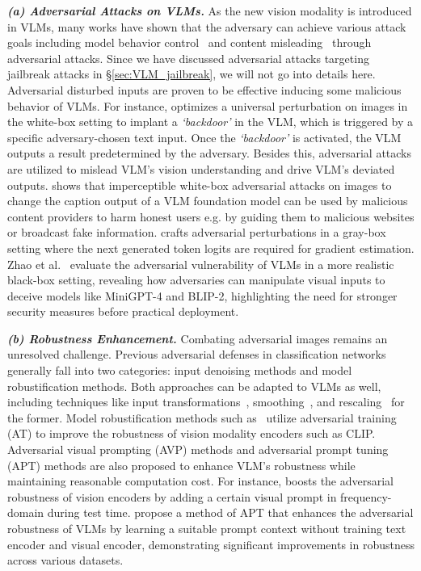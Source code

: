 \textit{\textbf{(a) Adversarial Attacks on VLMs.}} As the new vision modality is introduced in VLMs, many works have shown that the adversary can achieve various attack goals including model behavior control~\cite{bailey2023image,lu2024test} and content misleading~\cite{dong2023robust,bailey2023image,zhao2023evaluating,schlarmann2023adversarial, zhu2025calling} through adversarial attacks. Since we have discussed adversarial attacks targeting jailbreak attacks in \S\ref{sec:VLM_jailbreak}, we will not go into details here. Adversarial disturbed inputs are proven to be effective inducing some malicious behavior of VLMs. For instance, \cite{lu2024test} optimizes a universal perturbation on images in the white-box setting to implant a \textit{‘backdoor’} in the VLM, which is triggered by a specific adversary-chosen text input. Once the \textit{‘backdoor’} is activated, the VLM outputs a result predetermined by the adversary. Besides this, adversarial attacks are utilized to mislead VLM's vision understanding and drive VLM's deviated outputs. \cite{schlarmann2023adversarial} shows that imperceptible white-box adversarial attacks on images to change the caption output of a VLM foundation model can be used by malicious content providers to harm honest users e.g. by guiding them to malicious websites or broadcast fake information. \cite{bailey2023image} crafts adversarial perturbations in a gray-box setting where the next generated token logits are required for gradient estimation. Zhao et al.~\cite{zhao2023evaluating} evaluate the adversarial vulnerability of VLMs in a more realistic black-box setting, revealing how adversaries can manipulate visual inputs to deceive models like MiniGPT-4 and BLIP-2, highlighting the need for stronger security measures before practical deployment. 

\textit{\textbf{(b) Robustness Enhancement.}} Combating adversarial images remains an unresolved challenge. Previous adversarial defenses in classification networks generally fall into two categories: input denoising methods and model robustification methods. Both approaches can be adapted to VLMs as well, including techniques like input transformations~\cite{mustafa2019image}, smoothing~\cite{salman2020denoised}, and rescaling~\cite{xie2017mitigating} for the former. Model robustification methods such as~\cite{mao2022understanding,schlarmann2024robust} utilize adversarial training (AT) to improve the robustness of vision modality encoders such as CLIP. Adversarial visual prompting (AVP) methods and adversarial prompt tuning (APT) methods are also proposed to enhance VLM's robustness while maintaining reasonable computation cost. For instance, \cite{huang2023improving} boosts the adversarial robustness of vision encoders by adding a certain visual prompt in frequency-domain during test time. \cite{zhang2023adversarial,Li_2024_CVPR} propose a method of APT that enhances the adversarial robustness of VLMs by learning a suitable prompt context without training text encoder and visual encoder, demonstrating significant improvements in robustness across various datasets. 


